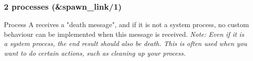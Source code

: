 \begin{frame}
    \frametitle{2 processes (\&spawn\_link/1)}
    \begin{center}
    \end{center}

    Process A receives a "death message", and if it is not a system process, no custom behaviour can be implemented when this message is received.
    \vfill
    \textit{Note: Even if it is a system process, the end result should also be death. 
    This is often used when you want to do certain actions, such as cleaning up your process.}
\end{frame}
